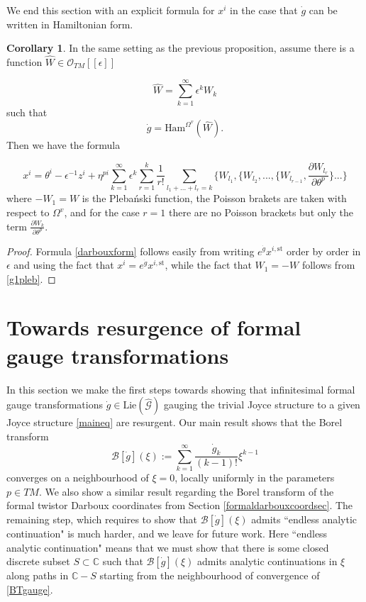 \documentclass{article}
\theoremstyle{definition}
\newtheorem{corollary}[theorem]{Corollary}
\numberwithin{equation}{section}
\begin{document}
We end this section with an explicit formula for $x^i$ in the case that $\dot{g}$ can be written in Hamiltonian form. 

\begin{corollary} In the same setting as the previous proposition, assume there is a function $\widehat{W}\in \mathcal{O}_{TM}[[\epsilon]]$

\begin{equation*}  \widehat{W}=\sum_{k=1}^{\infty}\epsilon^kW_k
\end{equation*}
such that \begin{equation*}
    \dot{g}=\text{Ham}^{\Omega^v}(\widehat{W}).
\end{equation*}
Then we have the formula

\begin{equation}\label{darbouxform}
    x^i=\theta^i-\epsilon^{-1}z^i+\eta^{pi}\sum_{k=1}^{\infty}\epsilon^{k}\sum_{r=1}^{k}\frac{1}{r!}\sum_{l_1+...+l_r=k}\{W_{l_1},\{W_{l_2},...,\{W_{l_{r-1}},\frac{\partial W_{l_r}}{\partial \theta^p}\}...\}
\end{equation}
where $-W_1=W$ is the Pleba\'nski function, the Poisson brakets are taken with respect to $\Omega^{v}$, and for the case $r=1$ there are no Poisson brackets but only the term $\frac{\partial W_k}{\partial \theta^p}$.
    
\end{corollary}
\begin{proof}

Formula \eqref{darbouxform} follows easily from writing $e^{\dot{g}}x^{i,\text{st}}$ order by order in $\epsilon$ and using the fact that $x^i=e^{\dot{g}}x^{i,\text{st}}$, while the fact that $W_1=-W$ follows from \eqref{g1pleb}.
\end{proof}
\section{Towards resurgence of formal gauge transformations}\label{sec4}

In this section we make the first steps towards showing that infinitesimal formal gauge transformations $\dot{g}\in \text{Lie}(\widehat{\mathcal{G}})$ gauging the trivial Joyce structure to a given Joyce structure \eqref{maineq} are resurgent. Our main result shows that the Borel transform 
\begin{equation}\label{BTgauge}
    \mathcal{B}[\dot{g}](\xi):=\sum_{k=1}^{\infty}\frac{\dot{g}_k}{(k-1)!}\xi^{k-1}
\end{equation}
converges on a neighbourhood of $\xi=0$, locally uniformly in the parameters $p\in TM$.  We also show a similar result regarding the Borel transform of the formal twistor Darboux coordinates from Section \ref{formaldarbouxcoordsec}. The remaining step, which requires to show that $\mathcal{B}[\dot{g}](\xi)$ admits ``endless analytic continuation" is much harder, and we leave for future work. Here ``endless analytic continuation" means that we must show that there is some closed discrete subset $S\subset \mathbb{C}$ such that $\mathcal{B}[\dot{g}](\xi)$ admits analytic continuations in $\xi$ along paths in $\mathbb{C}-S$ starting from the neighbourhood of convergence of \eqref{BTgauge}. \\
\end{document}
